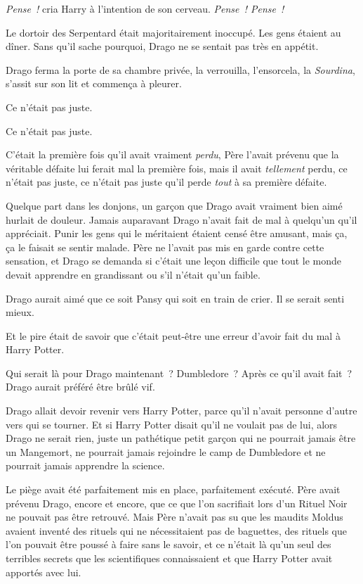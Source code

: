 \emph{Pense~!} cria Harry à l'intention de son cerveau. \emph{Pense~! Pense~!}

\later

Le dortoir des Serpentard était majoritairement inoccupé. Les gens étaient au dîner. Sans qu'il sache pourquoi, Drago ne se sentait pas très en appétit.

Drago ferma la porte de sa chambre privée, la verrouilla, l'ensorcela, la \emph{Sourdina}, s'assit sur son lit et commença à pleurer.

Ce n'était pas juste.

Ce n'était pas juste.

C'était la première fois qu'il avait vraiment \emph{perdu}, Père l'avait prévenu que la véritable défaite lui ferait mal la première fois, mais il avait \emph{tellement} perdu, ce n'était pas juste, ce n'était pas juste qu'il perde \emph{tout} à sa première défaite.

Quelque part dans les donjons, un garçon que Drago avait vraiment bien aimé hurlait de douleur. Jamais auparavant Drago n'avait fait de mal à quelqu'un qu'il appréciait. Punir les gens qui le méritaient étaient censé être amusant, mais ça, ça le faisait se sentir malade. Père ne l'avait pas mis en garde contre cette sensation, et Drago se demanda si c'était une leçon difficile que tout le monde devait apprendre en grandissant ou s'il n'était qu'un faible.

Drago aurait aimé que ce soit Pansy qui soit en train de crier. Il se serait senti mieux.

Et le pire était de savoir que c'était peut-être une erreur d'avoir fait du mal à Harry Potter.

Qui serait là pour Drago maintenant~? Dumbledore~? Après ce qu'il avait fait~? Drago aurait préféré être brûlé vif.

Drago allait devoir revenir vers Harry Potter, parce qu'il n'avait personne d'autre vers qui se tourner. Et si Harry Potter disait qu'il ne voulait pas de lui, alors Drago ne serait rien, juste un pathétique petit garçon qui ne pourrait jamais être un Mangemort, ne pourrait jamais rejoindre le camp de Dumbledore et ne pourrait jamais apprendre la science.

Le piège avait été parfaitement mis en place, parfaitement exécuté. Père avait prévenu Drago, encore et encore, que ce que l'on sacrifiait lors d'un Rituel Noir ne pouvait pas être retrouvé. Mais Père n'avait pas su que les maudits Moldus avaient inventé des rituels qui ne nécessitaient pas de baguettes, des rituels que l'on pouvait être poussé à faire sans le savoir, et ce n'était là qu'un seul des terribles secrets que les scientifiques connaissaient et que Harry Potter avait apportés avec lui.

